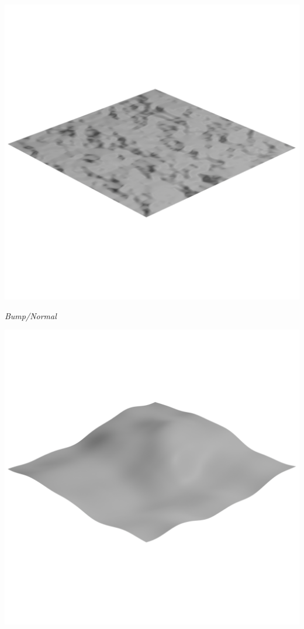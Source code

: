 \documentclass[11pt,class=report,crop=false]{standalone}
\begin{document}
\begin{center}
	\begin{minipage}{0.32\textwidth}	
		\center
		\includegraphics[scale=\myscale,scale=0.13,trim={0 8cm 0 8cm},clip]{figures/texture-plan-bump}
		
		\emph{Bump/Normal}
	\end{minipage}	
	\begin{minipage}{0.32\textwidth}
		\center
		\includegraphics[scale=\myscale,scale=0.13,trim={0 8cm 0 8cm},clip]{figures/texture-plan-bump-dis1}
		

\end{minipage}
\end{center}
\end{document}
